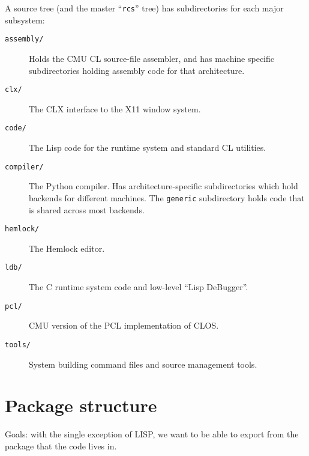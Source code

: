 A source tree (and the master ``{\tt rcs}'' tree) has subdirectories for each
major subsystem:
\begin{description}
\item[{\tt assembly/}] Holds the CMU CL source-file assembler, and has machine
specific subdirectories holding assembly code for that architecture.

\item[{\tt clx/}] The CLX interface to the X11 window system.

\item[{\tt code/}] The Lisp code for the runtime system and standard CL
utilities.

\item[{\tt compiler/}] The Python compiler.  Has architecture-specific
subdirectories which hold backends for different machines.  The {\tt generic}
subdirectory holds code that is shared across most backends.

\item[{\tt hemlock/}] The Hemlock editor.

\item[{\tt ldb/}] The C runtime system code and low-level ``Lisp DeBugger''.

\item[{\tt pcl/}] CMU version of the PCL implementation of CLOS.

\item[{\tt tools/}] System building command files and source management tools.
\end{description}


\section{Package structure}

Goals: with the single exception of LISP, we want to be able to export from the
package that the code lives in.

